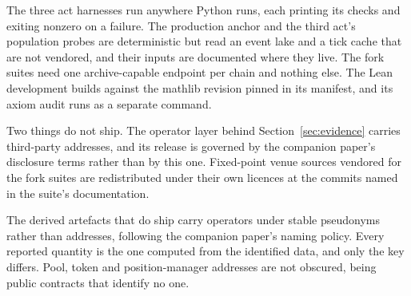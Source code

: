 \documentclass[11pt,a4paper]{article}
\theoremstyle{definition}
\theoremstyle{plain}
\theoremstyle{remark}
\begin{document}
The three act harnesses run anywhere Python runs, each printing its checks and exiting nonzero on a failure. The production anchor and the third act's population probes are deterministic but read 
an event lake and a tick cache that are not vendored, and their inputs are documented where they live. The fork suites need one archive-capable endpoint per chain and nothing else. The Lean 
development builds against the mathlib revision pinned in its manifest, and its axiom audit runs as a separate command.

Two things do not ship. The operator layer behind Section~\ref{sec:evidence} carries third-party addresses, and its release is governed by the companion paper's disclosure terms rather than by
 this one. Fixed-point venue sources vendored for the fork suites are redistributed under their own licences at the commits named in the suite's documentation.

The derived artefacts that do ship carry operators under stable pseudonyms rather than addresses, following the companion paper's naming policy. Every reported quantity is the one computed
 from the identified data, and only the key differs. Pool, token and position-manager addresses are not obscured, being public contracts that identify no one.
\end{document}
